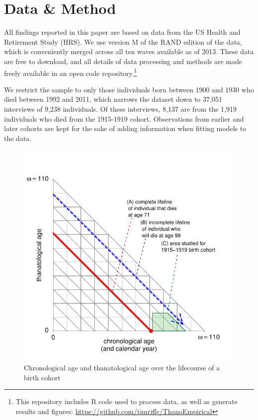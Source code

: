 \documentclass[11pt,oneside]{article} %
\begin{document}
\section*{Data \& Method}

All findings reported in this paper are based on data from the US Health and
Retirement Study (HRS). We use version M of the RAND edition of the data, which
is conveniently merged across all ten waves available as of 2013.
These data are free to download, and all details of data processing and methods are made freely available in an open code
repository.\footnote{This
repository includes R code used to process data, as well as generate results and
figures: \url{https://github.com/timriffe/ThanoEmpirical}}

We restrict the sample to only those
individuals born between 1900 and 1930 who died between 1992 and 2011, which
narrows the dataset down to 37,051 interviews of 9,238 individuals. Of
these interviews, 8,137 are from the 1,919 individuals who died from the
1915-1919 cohort. Observations from earlier and later cohorts are kept for the
sake of adding information when fitting models to the data.
%
\begin{figure}[!h]
\centering
\caption{Chronological age and thanatological age over the lifecourse of a birth
cohort}
\label{fig:LexisOrtho}
	\includegraphics{Figures/LexisOrtho.pdf}
\end{figure}
\end{document}
